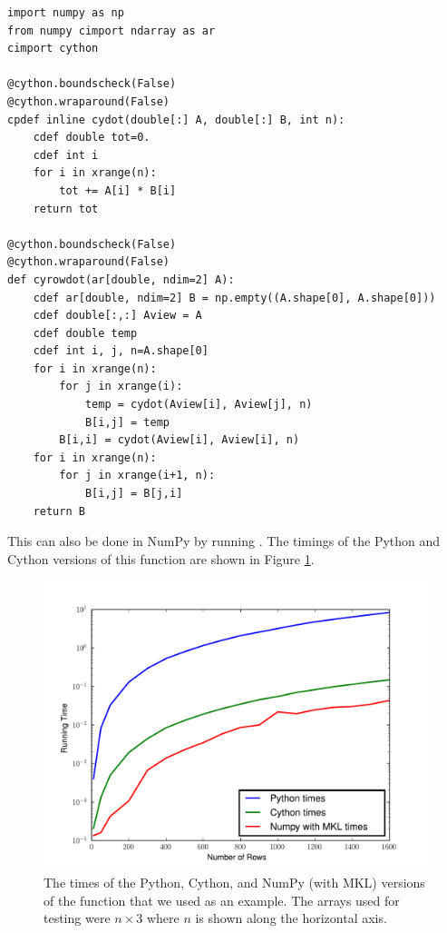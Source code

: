 \begin{lstlisting}
import numpy as np
from numpy cimport ndarray as ar
cimport cython

@cython.boundscheck(False)
@cython.wraparound(False)
cpdef inline cydot(double[:] A, double[:] B, int n):
    cdef double tot=0.
    cdef int i
    for i in xrange(n):
        tot += A[i] * B[i]
    return tot

@cython.boundscheck(False)
@cython.wraparound(False)
def cyrowdot(ar[double, ndim=2] A):
    cdef ar[double, ndim=2] B = np.empty((A.shape[0], A.shape[0]))
    cdef double[:,:] Aview = A
    cdef double temp
    cdef int i, j, n=A.shape[0]
    for i in xrange(n):
        for j in xrange(i):
            temp = cydot(Aview[i], Aview[j], n)
            B[i,j] = temp
        B[i,i] = cydot(Aview[i], Aview[i], n)
    for i in xrange(n):
        for j in xrange(i+1, n):
            B[i,j] = B[j,i]
    return B
\end{lstlisting}

This can also be done in NumPy by running .
The timings of the Python and Cython versions of this function are shown in Figure \ref{cython:rowdot}.

\begin{figure}
\centering
\includegraphics[width=\textwidth]{rowdot.pdf}
\caption{The times of the Python, Cython, and NumPy (with MKL) versions of the  function that we used as an example.
The arrays used for testing were $n\times 3$ where $n$ is shown along the horizontal axis.}
\label{cython:rowdot}
\end{figure}

